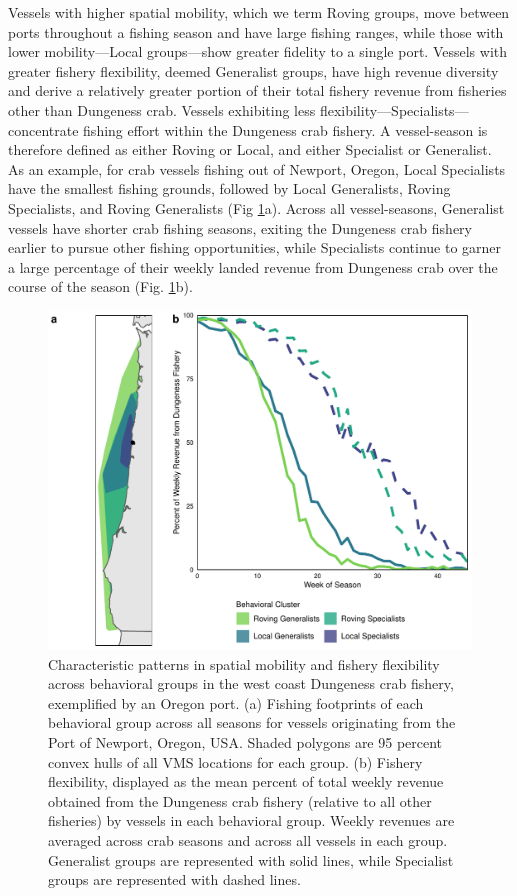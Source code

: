 \documentclass[]{elsarticle} %
\begin{document}
Vessels with higher spatial mobility, which we term Roving groups, move
between ports throughout a fishing season and have large fishing ranges,
while those with lower mobility---Local groups---show greater fidelity
to a single port. Vessels with greater fishery flexibility, deemed
Generalist groups, have high revenue diversity and derive a relatively
greater portion of their total fishery revenue from fisheries other than
Dungeness crab. Vessels exhibiting less
flexibility---Specialists---concentrate fishing effort within the
Dungeness crab fishery. A vessel-season is therefore defined as either
Roving or Local, and either Specialist or Generalist. As an example, for
crab vessels fishing out of Newport, Oregon, Local Specialists have the
smallest fishing grounds, followed by Local Generalists, Roving
Specialists, and Roving Generalists (Fig \ref{fig:characteristics}a).
Across all vessel-seasons, Generalist vessels have shorter crab fishing
seasons, exiting the Dungeness crab fishery earlier to pursue other
fishing opportunities, while Specialists continue to garner a large
percentage of their weekly landed revenue from Dungeness crab over the
course of the season (Fig. \ref{fig:characteristics}b).

\begin{figure}%
\includegraphics[width=\linewidth]{groups_mobility_flexibility.pdf}
\caption{Characteristic patterns in spatial mobility and fishery flexibility across behavioral groups in the west coast Dungeness crab fishery, exemplified by an Oregon port. (a) Fishing footprints of each behavioral group across all seasons for vessels originating from the Port of Newport, Oregon, USA. Shaded polygons are 95 percent convex hulls of all VMS locations for each group. (b) Fishery flexibility, displayed as the mean percent of total weekly revenue obtained from the Dungeness crab fishery (relative to all other fisheries) by vessels in each behavioral group. Weekly revenues are averaged across crab seasons and across all vessels in each group. Generalist groups are represented with solid lines, while Specialist groups are represented with dashed lines.}
\label{fig:characteristics}
\end{figure}
\end{document}
